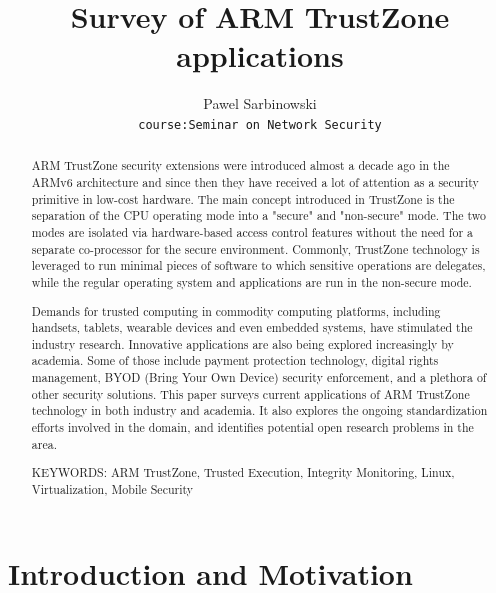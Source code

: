 \documentclass[cameraready]{cseminar}
\begin{document}

\title{Survey of ARM TrustZone applications}

\author{Pawel Sarbinowski\\
	\texttt{course:Seminar on Network Security}}
\maketitle


\begin{abstract}

   ARM TrustZone security extensions were introduced almost a decade ago in the ARMv6 architecture and since then they have received a lot of attention as a security primitive in low-cost hardware. The main concept introduced in TrustZone is the separation of the CPU operating mode into a "secure" and "non-secure" mode. The two modes are isolated via hardware-based access control features without the need for a separate co-processor for the secure environment. Commonly, TrustZone technology is leveraged to run minimal pieces of software to which sensitive operations are delegates, while the regular operating system and applications are run in the non-secure mode.
   
Demands for trusted computing in commodity computing platforms, including handsets, tablets, wearable devices and even embedded systems, have stimulated the industry research. Innovative applications are also being explored increasingly by academia. Some of those include payment protection technology, digital rights management, BYOD (Bring Your Own Device) security enforcement, and a plethora of other security solutions.
   This paper surveys current applications of ARM TrustZone technology in both industry and academia. It also explores the ongoing standardization efforts involved in the domain, and identifies potential open research problems in the area.

\vspace{3mm}
\noindent KEYWORDS: ARM TrustZone, Trusted Execution, Integrity Monitoring, Linux, Virtualization, Mobile Security

\end{abstract}



\section{Introduction and Motivation}
\end{document}
